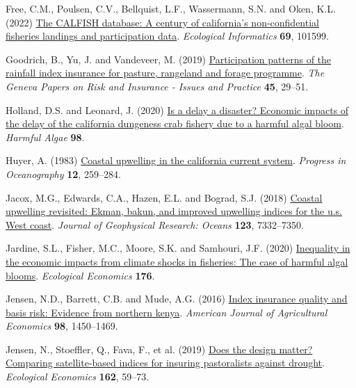 \documentclass[
  letterpaper,
  DIV=11,
  numbers=noendperiod]{scrartcl}
\newlength{\cslhangindent}
\newlength{\cslentryspacingunit} %
\newenvironment{CSLReferences}[2] %
 {%
  \setlength{\parindent}{0pt}
  \ifodd #1
  \let\oldpar\par
  \def\par{\hangindent=\cslhangindent\oldpar}
  \fi
  \setlength{\parskip}{#2\cslentryspacingunit}
 }%
 {}
\begin{document}
\begin{CSLReferences}{1}{0}
\leavevmode{}%
Free, C.M., Poulsen, C.V., Bellquist, L.F., Wassermann, S.N. and Oken,
K.L. (2022) \href{https://doi.org/10.1016/j.ecoinf.2022.101599}{The
CALFISH database: A century of california's non-confidential fisheries
landings and participation data}. \emph{Ecological Informatics}
\textbf{69}, 101599.

\leavevmode{}%
Goodrich, B., Yu, J. and Vandeveer, M. (2019)
\href{https://doi.org/10.1057/s41288-019-00149-3}{Participation patterns
of the rainfall index insurance for pasture, rangeland and forage
programme}. \emph{The Geneva Papers on Risk and Insurance - Issues and
Practice} \textbf{45}, 29--51.

\leavevmode{}%
Holland, D.S. and Leonard, J. (2020)
\href{https://doi.org/10.1016/j.hal.2020.101904}{Is a delay a disaster?
Economic impacts of the delay of the california dungeness crab fishery
due to a harmful algal bloom}. \emph{Harmful Algae} \textbf{98}.

\leavevmode{}%
Huyer, A. (1983)
\href{https://doi.org/10.1016/0079-6611(83)90010-1}{Coastal upwelling in
the california current system}. \emph{Progress in Oceanography}
\textbf{12}, 259--284.

\leavevmode{}%
Jacox, M.G., Edwards, C.A., Hazen, E.L. and Bograd, S.J. (2018)
\href{https://doi.org/10.1029/2018JC014187}{Coastal upwelling revisited:
Ekman, bakun, and improved upwelling indices for the u.s. West coast}.
\emph{Journal of Geophysical Research: Oceans} \textbf{123}, 7332--7350.

\leavevmode{}%
Jardine, S.L., Fisher, M.C., Moore, S.K. and Samhouri, J.F. (2020)
\href{https://doi.org/10.1016/j.ecolecon.2020.106691}{Inequality in the
economic impacts from climate shocks in fisheries: The case of harmful
algal blooms}. \emph{Ecological Economics} \textbf{176}.

\leavevmode{}%
Jensen, N.D., Barrett, C.B. and Mude, A.G. (2016)
\href{https://doi.org/10.1093/ajae/aaw046}{Index insurance quality and
basis risk: Evidence from northern kenya}. \emph{American Journal of
Agricultural Economics} \textbf{98}, 1450--1469.

\leavevmode{}%
Jensen, N., Stoeffler, Q., Fava, F., et al. (2019)
\href{https://doi.org/10.1016/J.ECOLECON.2019.04.014}{Does the design
matter? Comparing satellite-based indices for insuring pastoralists
against drought}. \emph{Ecological Economics} \textbf{162}, 59--73.


\end{CSLReferences}
\end{document}
